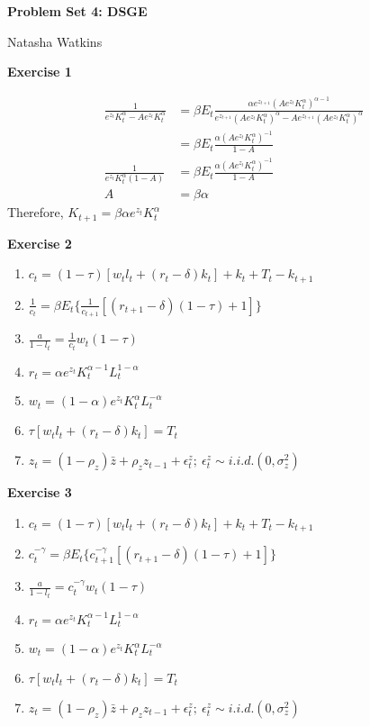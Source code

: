 \documentclass[letterpaper,12pt]{article}
\begin{document}
\textbf{\large Problem Set 4: DSGE}

Natasha Watkins

\vspace{5mm}

\textbf{Exercise 1}

\begin{align*}
\frac{1}{e^{z_t}K_t^\alpha - Ae^{z_t}K_t^\alpha} &=
\beta E_t \frac{\alpha e^{z_{t+1}} (Ae^{z_t}K_t^\alpha)^{\alpha-1} } {e^{z_{t+1}} (Ae^{z_t}K_t^\alpha)^\alpha - Ae^{z_{t+1}}(Ae^{z_t}K_t^\alpha)^\alpha} \\
&= 
\beta E_t \frac{\alpha  (Ae^{z_t}K_t^\alpha)^{-1}}{ 1 - A} \\
\frac{1}{e^{z_t}K_t^\alpha(1 - A)}
&= 
\beta E_t \frac{\alpha  (Ae^{z_t}K_t^\alpha)^{-1}}{ 1 - A} \\
A
&= 
\beta \alpha
\end{align*}
Therefore,
$K_{t+1} = \beta \alpha e^{z_t} K_t^\alpha$

\textbf{Exercise 2}

\begin{enumerate}
	\item $c_t = (1 - \tau)[w_t l_t + (r_t - \delta) k_t] + k_t + T_t - k_{t+1}$
	\item $\frac{1}{c_t} = \beta E_t \{\frac{1}{c_{t+1}} [(r_{t+1} - \delta)(1 - \tau) + 1]\}$
	\item $\frac{a}{1 - l_t} = \frac{1}{c_t} w_t (1 - \tau)$
	\item $r_t = \alpha e^{z_t} K_t^{\alpha - 1} L_t^{1 - \alpha}$
	\item $w_t = (1 - \alpha) e^{z_t} K_t^\alpha L_t^{-\alpha}$
	\item $\tau[w_t l_t + (r_t - \delta) k_t] = T_t$
	\item $z_t = (1 - \rho_z) \bar{z} + \rho_z z_{t-1} + \epsilon_t^z; \ \epsilon_t^z \sim i.i.d.(0, \sigma_z^2)$
\end{enumerate}

\textbf{Exercise 3}

\begin{enumerate}
	\item $c_t = (1 - \tau)[w_t l_t + (r_t - \delta) k_t] + k_t + T_t - k_{t+1}$
	\item $c_t^{-\gamma} = \beta E_t \{c_{t+1}^{-\gamma} [(r_{t+1} - \delta)(1 - \tau) + 1]\}$
	\item $\frac{a}{1 - l_t} = c_t^{-\gamma} w_t (1 - \tau)$
	\item $r_t = \alpha e^{z_t} K_t^{\alpha - 1} L_t^{1 - \alpha}$
	\item $w_t = (1 - \alpha) e^{z_t} K_t^\alpha L_t^{-\alpha}$
	\item $\tau[w_t l_t + (r_t - \delta) k_t] = T_t$
	\item $z_t = (1 - \rho_z) \bar{z} + \rho_z z_{t-1} + \epsilon_t^z; \ \epsilon_t^z \sim i.i.d.(0, \sigma_z^2)$
\end{enumerate}
\end{document}
